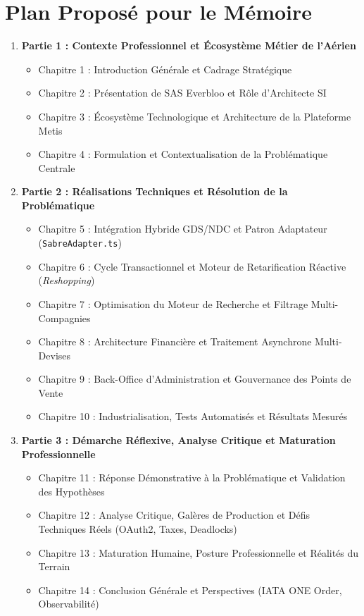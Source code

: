 \documentclass[11pt,a4paper]{article}
\begin{document}
\section{Plan Proposé pour le Mémoire}
\begin{enumerate}[itemsep=3pt]
    \item \textbf{Partie 1 : Contexte Professionnel et Écosystème Métier de l'Aérien}
    \begin{itemize}[itemsep=1pt]
        \item Chapitre 1 : Introduction Générale et Cadrage Stratégique
        \item Chapitre 2 : Présentation de SAS Everbloo et Rôle d'Architecte SI
        \item Chapitre 3 : Écosystème Technologique et Architecture de la Plateforme Metis
        \item Chapitre 4 : Formulation et Contextualisation de la Problématique Centrale
    \end{itemize}
    \item \textbf{Partie 2 : Réalisations Techniques et Résolution de la Problématique}
    \begin{itemize}[itemsep=1pt]
        \item Chapitre 5 : Intégration Hybride GDS/NDC et Patron Adaptateur (\texttt{SabreAdapter.ts})
        \item Chapitre 6 : Cycle Transactionnel et Moteur de Retarification Réactive (\textit{Reshopping})
        \item Chapitre 7 : Optimisation du Moteur de Recherche et Filtrage Multi-Compagnies
        \item Chapitre 8 : Architecture Financière et Traitement Asynchrone Multi-Devises
        \item Chapitre 9 : Back-Office d'Administration et Gouvernance des Points de Vente
        \item Chapitre 10 : Industrialisation, Tests Automatisés et Résultats Mesurés
    \end{itemize}
    \item \textbf{Partie 3 : Démarche Réflexive, Analyse Critique et Maturation Professionnelle}
    \begin{itemize}[itemsep=1pt]
        \item Chapitre 11 : Réponse Démonstrative à la Problématique et Validation des Hypothèses
        \item Chapitre 12 : Analyse Critique, Galères de Production et Défis Techniques Réels (OAuth2, Taxes, Deadlocks)
        \item Chapitre 13 : Maturation Humaine, Posture Professionnelle et Réalités du Terrain
        \item Chapitre 14 : Conclusion Générale et Perspectives (IATA ONE Order, Observabilité)
    \end{itemize}
\end{enumerate}
\end{document}
